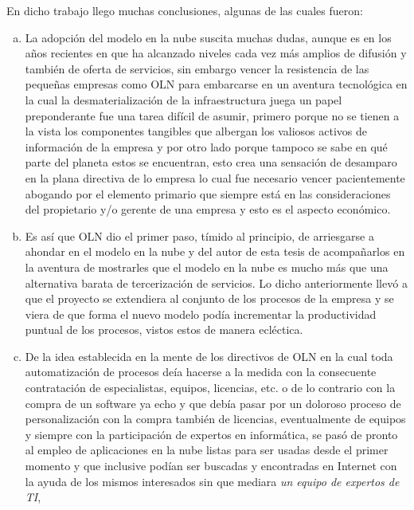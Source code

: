En dicho trabajo llego muchas conclusiones, algunas de las cuales fueron:
\begin{enumerate}[a.]
    \item La adopción del modelo en la nube suscita muchas dudas, aunque es en
          los años recientes en que ha alcanzado niveles cada vez más amplios
          de difusión y también de oferta de servicios, sin embargo vencer la
          resistencia de las pequeñas empresas como OLN para embarcarse en un
          aventura tecnológica en la cual la desmaterialización de la
          infraestructura juega un papel preponderante fue una tarea difícil
          de asumir, primero porque no se tienen a la vista los componentes
          tangibles que albergan los valiosos activos de información de la
          empresa y por otro lado porque tampoco se sabe en qué parte del
          planeta estos se encuentran, esto crea una sensación de desamparo en
          la plana directiva de lo empresa lo cual fue necesario vencer
          pacientemente abogando por el elemento primario que siempre está en
          las consideraciones del propietario y/o gerente de una empresa y esto
          es el aspecto económico.
    \item Es así que OLN dio el primer paso, tímido al principio, de arriesgarse
          a ahondar en el modelo en la nube y del autor de esta tesis de acompañarlos
          en la aventura de mostrarles que el modelo en la nube es mucho más
          que una alternativa barata de tercerización de servicios. Lo dicho
          anteriormente llevó a que el proyecto se extendiera al conjunto de
          los procesos de la empresa y se viera de que forma el nuevo modelo
          podía incrementar la productividad puntual de los procesos, vistos
          estos de manera ecléctica.
    \item De la idea establecida en la mente de los directivos de OLN en la cual
          toda automatización de procesos deía hacerse a la medida con la
          consecuente contratación de especialistas, equipos, licencias, etc.
          o de lo contrario con la compra de un software ya echo y que debía
          pasar por un doloroso proceso de personalización con la compra también
          de licencias, eventualmente de equipos y siempre con la participación
          de expertos en informática, se pasó de pronto al empleo de aplicaciones
          en la nube listas para ser usadas desde el primer momento y que inclusive
          podían ser buscadas y encontradas en Internet con la ayuda de los
          mismos interesados sin que mediara \emph{un equipo de expertos de TI},

\end{enumerate}
